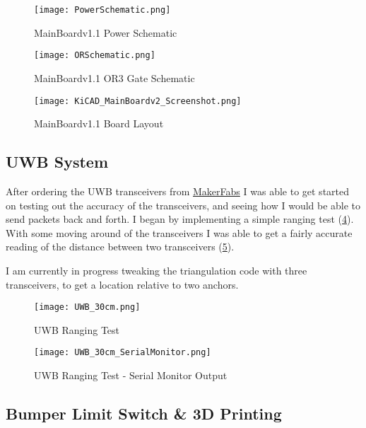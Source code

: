 \documentclass{report}
\begin{document}
    \begin{figure}[ht!]
        \centering
        \texttt{[image: PowerSchematic.png]}
        \caption{MainBoardv1.1 Power Schematic}
        \label{fig:PowerSchematic}
    \end{figure}

    \begin{figure}[ht!]
        \centering
        \texttt{[image: ORSchematic.png]}
        \caption{MainBoardv1.1 OR3 Gate Schematic}
        \label{fig:ORSchematic}
    \end{figure}

    \begin{figure}[ht!]
        \centering
        \texttt{[image: KiCAD\_MainBoardv2\_Screenshot.png]}
        \caption{MainBoardv1.1 Board Layout}
        \label{fig:MainBoardv1.1_Layout}
    \end{figure}
    
    \subsection{UWB System}
    After ordering the UWB transceivers from \href{https://www.makerfabs.com/esp32-uwb-dw3000.html}{MakerFabs} I was able to get started on testing out the accuracy of the transceivers, and seeing how I would be able to send packets back and forth. I began by implementing a simple ranging test (\ref{fig:UWBRanging}). With some moving around of the transceivers I was able to get a fairly accurate reading of the distance between two transceivers (\ref{fig:UWBRangingSerialMonitor}).

    I am currently in progress tweaking the triangulation code with three transceivers, to get a location relative to two anchors.

    \begin{figure}[ht!]
        \centering
        \texttt{[image: UWB\_30cm.png]}
        \caption{UWB Ranging Test}
        \label{fig:UWBRanging}
    \end{figure}

    \begin{figure}[ht!]
        \centering
        \texttt{[image: UWB\_30cm\_SerialMonitor.png]}
        \caption{UWB Ranging Test - Serial Monitor Output}
        \label{fig:UWBRangingSerialMonitor}
    \end{figure}

    \subsection{Bumper Limit Switch \& 3D Printing}
\end{document}
